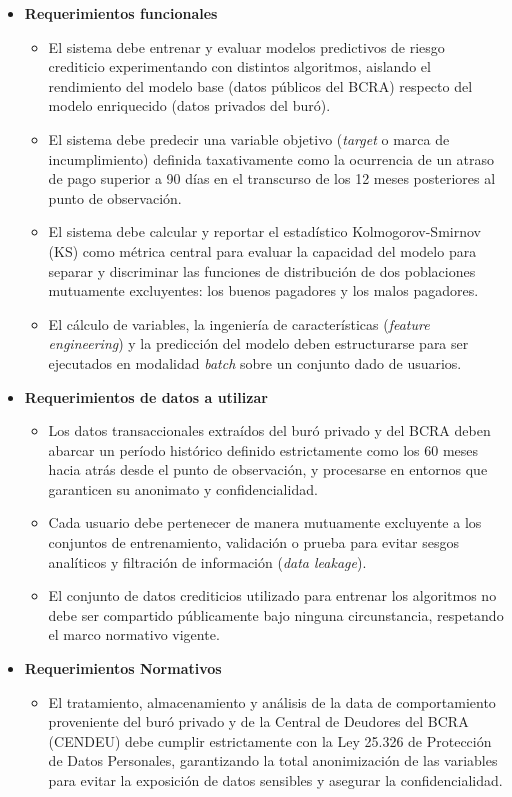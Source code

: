 \documentclass[
11pt, %
]{charter}
\begin{document}
\begin{itemize}

    \item \textbf{Requerimientos funcionales}
    \begin{itemize}
        \item El sistema debe entrenar y evaluar modelos predictivos de riesgo crediticio experimentando con distintos algoritmos, aislando el rendimiento del modelo base (datos públicos del BCRA) respecto del modelo enriquecido (datos privados del buró).
        \item El sistema debe predecir una variable objetivo (\textit{target} o marca de incumplimiento) definida taxativamente como la ocurrencia de un atraso de pago superior a 90 días en el transcurso de los 12 meses posteriores al punto de observación.
        \item El sistema debe calcular y reportar el estadístico Kolmogorov-Smirnov (KS) como métrica central para evaluar la capacidad del modelo para separar y discriminar las funciones de distribución de dos poblaciones mutuamente excluyentes: los buenos pagadores y los malos pagadores.
        \item El cálculo de variables, la ingeniería de características (\textit{feature engineering}) y la predicción del modelo deben estructurarse para ser ejecutados en modalidad \textit{batch} sobre un conjunto dado de usuarios.
    \end{itemize}

    \item \textbf{Requerimientos de datos a utilizar}
    \begin{itemize}
        \item Los datos transaccionales extraídos del buró privado y del BCRA deben abarcar un período histórico definido estrictamente como los 60 meses hacia atrás desde el punto de observación, y procesarse en entornos que garanticen su anonimato y confidencialidad.
        \item Cada usuario debe pertenecer de manera mutuamente excluyente a los conjuntos de entrenamiento, validación o prueba para evitar sesgos analíticos y filtración de información (\textit{data leakage}).
        \item El conjunto de datos crediticios utilizado para entrenar los algoritmos no debe ser compartido públicamente bajo ninguna circunstancia, respetando el marco normativo vigente.
    \end{itemize}

    \item \textbf{Requerimientos Normativos}
    \begin{itemize}
        \item El tratamiento, almacenamiento y análisis de la data de comportamiento proveniente del buró privado y de la Central de Deudores del BCRA (CENDEU) debe cumplir estrictamente con la Ley 25.326 de Protección de Datos Personales, garantizando la total anonimización de las variables para evitar la exposición de datos sensibles y asegurar la confidencialidad.
    \end{itemize}


\end{itemize}
\end{document}
